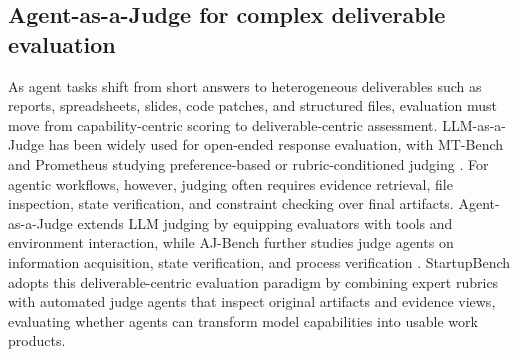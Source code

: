 \subsection{Agent-as-a-Judge for complex deliverable evaluation}
As agent tasks shift from short answers to heterogeneous deliverables such as reports, spreadsheets, slides, code patches, and structured files, evaluation must move from capability-centric scoring to deliverable-centric assessment\cite{you2026agent}. LLM-as-a-Judge has been widely used for open-ended response evaluation, with MT-Bench and Prometheus studying preference-based or rubric-conditioned judging \citep{zheng2023judging, kim2024prometheus}. For agentic workflows, however, judging often requires evidence retrieval, file inspection, state verification, and constraint checking over final artifacts. Agent-as-a-Judge extends LLM judging by equipping evaluators with tools and environment interaction, while AJ-Bench further studies judge agents on information acquisition, state verification, and process verification \citep{zhuge2024agent, shi2026aj}. StartupBench adopts this deliverable-centric evaluation paradigm by combining expert rubrics with automated judge agents that inspect original artifacts and evidence views, evaluating whether agents can transform model capabilities into usable work products.


